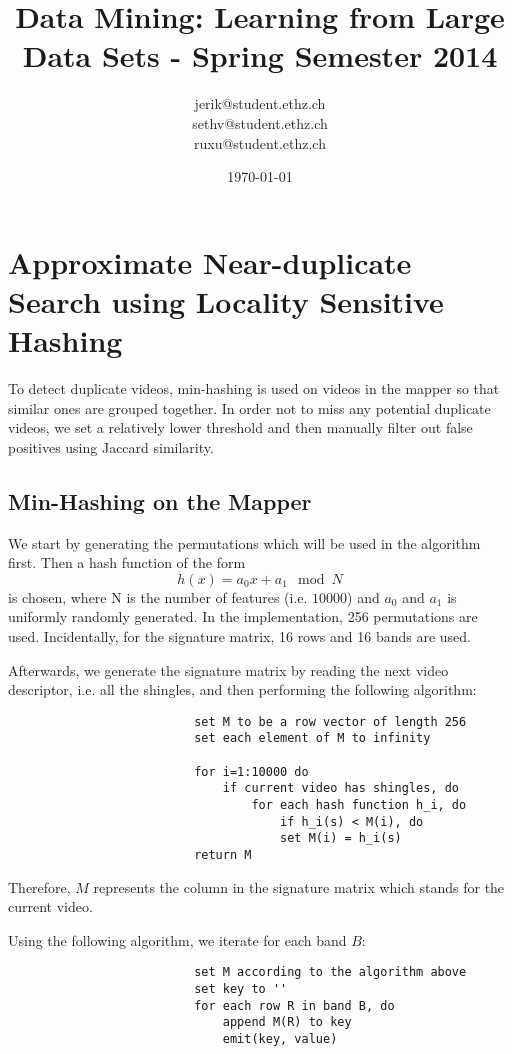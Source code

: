 \documentclass[a4paper, 11pt]{article}
\title{Data Mining: Learning from Large Data Sets - Spring Semester 2014}
\author{jerik@student.ethz.ch\\ sethv@student.ethz.ch\\ ruxu@student.ethz.ch\\}
\date{\today}
\begin{document}
\maketitle

\section{Approximate Near-duplicate Search using Locality Sensitive Hashing} 
To detect duplicate videos, min-hashing is used on videos in the mapper so that similar ones are grouped together. In order not to miss any potential duplicate videos, we set a relatively lower threshold and then manually filter out false positives using Jaccard similarity.

        \subsection{Min-Hashing on the Mapper}
                We start by generating the permutations which will be used in the algorithm first. Then a hash function of the form
                        \[h(x) = a_0x + a_1 \mod N\]
                is chosen, where N is the number of features (i.e. $10000$) and $a_0$ and $a_1$ is uniformly randomly generated. In the implementation, 256 permutations are used. Incidentally, for the signature matrix, 16 rows and 16 bands are used.

                Afterwards, we generate the signature matrix by reading the next video descriptor, i.e. all the shingles, and then performing the following algorithm:
                \begin{verbatim}
                          set M to be a row vector of length 256 
                          set each element of M to infinity

                          for i=1:10000 do
                              if current video has shingles, do
                                  for each hash function h_i, do
                                      if h_i(s) < M(i), do
                                      set M(i) = h_i(s)
                          return M
                \end{verbatim}
                Therefore, $M$ represents the column in the signature matrix which stands for the current video.
                \pagebreak

                Using the following algorithm, we iterate for each band $B$:
                \begin{verbatim}
                          set M according to the algorithm above
                          set key to ''
                          for each row R in band B, do
                              append M(R) to key
                              emit(key, value)
                \end{verbatim}
\end{document}
